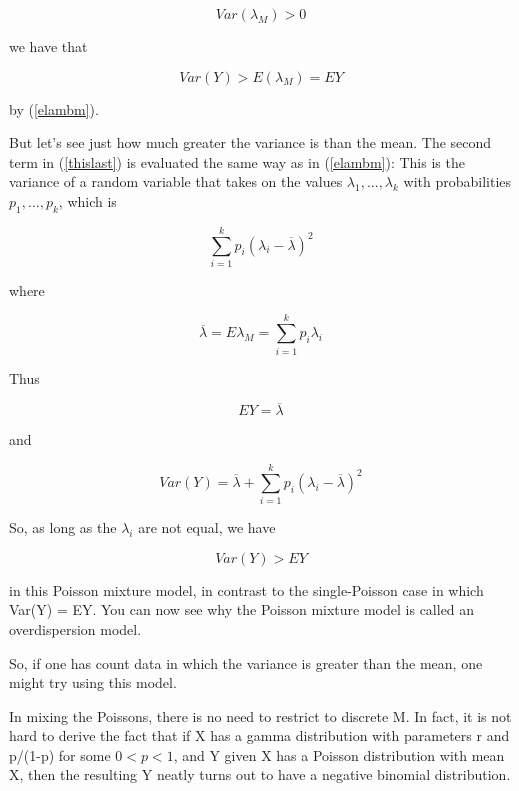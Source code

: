 \begin{equation}
Var(\lambda_M) > 0
\end{equation}

we have that

\begin{equation}
Var(Y) > E(\lambda_M) = EY
\end{equation}

by (\ref{elambm}).

But let's see just how much greater the variance is than the mean.  The
second term in (\ref{thislast}) is evaluated the same way as in
(\ref{elambm}):  This is the variance of a random variable that takes on
the values $\lambda_1,...,\lambda_k$ with probabilities $p_1,...,p_k$,
which is

\begin{equation}
\sum_{i=1}^k p_i (\lambda_i - \overline{\lambda})^2
\end{equation}

where 

\begin{equation}
\overline{\lambda} =  E\lambda_M = \sum_{i=1}^k p_i \lambda_i
\end{equation}

Thus

\begin{equation}
EY = \overline{\lambda}
\end{equation}

and

\begin{equation}
Var(Y) = \overline{\lambda} + 
\sum_{i=1}^k p_i (\lambda_i - \overline{\lambda})^2
\end{equation}

So, as long as the $\lambda_i$ are not equal, we have

\begin{equation}
Var(Y) > EY
\end{equation}

in this Poisson mixture model, in contrast to the single-Poisson case
in which Var(Y) = EY.  You can now see why the Poisson mixture model is
called an overdispersion model.

So, if one has count data in which the variance is greater than the
mean, one might try using this model.

In mixing the Poissons, there is no need to restrict to discrete M.  In
fact, it is not hard to derive the fact that if X has a gamma
distribution with parameters r and p/(1-p) for some $0 < p < 1$, and Y
given X has a Poisson distribution with mean X, then the resulting Y
neatly turns out to have a negative binomial distribution.

